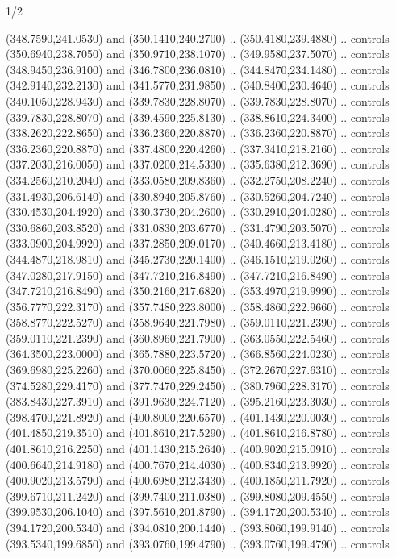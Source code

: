 \begin{flagdescription}{1/2}
\begin{scope}[xshift=0.5\flaglength]
\begin{scope}[scale=0.004\flagwidth,xshift=-90mm,yshift=89mm]
\begin{scope}[y=0.80pt, x=0.80pt, yscale=-1, xscale=1, inner sep=0pt, outer sep=0pt]
  (348.7590,241.0530) and (350.1410,240.2700) .. (350.4180,239.4880) .. controls
  (350.6940,238.7050) and (350.9710,238.1070) .. (349.9580,237.5070) .. controls
  (348.9450,236.9100) and (346.7800,236.0810) .. (344.8470,234.1480) .. controls
  (342.9140,232.2130) and (341.5770,231.9850) .. (340.8400,230.4640) .. controls
  (340.1050,228.9430) and (339.7830,228.8070) .. (339.7830,228.8070) .. controls
  (339.7830,228.8070) and (339.4590,225.8130) .. (338.8610,224.3400) .. controls
  (338.2620,222.8650) and (336.2360,220.8870) .. (336.2360,220.8870) .. controls
  (336.2360,220.8870) and (337.4800,220.4260) .. (337.3410,218.2160) .. controls
  (337.2030,216.0050) and (337.0200,214.5330) .. (335.6380,212.3690) .. controls
  (334.2560,210.2040) and (333.0580,209.8360) .. (332.2750,208.2240) .. controls
  (331.4930,206.6140) and (330.8940,205.8760) .. (330.5260,204.7240) .. controls
  (330.4530,204.4920) and (330.3730,204.2600) .. (330.2910,204.0280) .. controls
  (330.6860,203.8520) and (331.0830,203.6770) .. (331.4790,203.5070) .. controls
  (333.0900,204.9920) and (337.2850,209.0170) .. (340.4660,213.4180) .. controls
  (344.4870,218.9810) and (345.2730,220.1400) .. (346.1510,219.0260) .. controls
  (347.0280,217.9150) and (347.7210,216.8490) .. (347.7210,216.8490) .. controls
  (347.7210,216.8490) and (350.2160,217.6820) .. (353.4970,219.9990) .. controls
  (356.7770,222.3170) and (357.7480,223.8000) .. (358.4860,222.9660) .. controls
  (358.8770,222.5270) and (358.9640,221.7980) .. (359.0110,221.2390) .. controls
  (359.0110,221.2390) and (360.8960,221.7900) .. (363.0550,222.5460) .. controls
  (364.3500,223.0000) and (365.7880,223.5720) .. (366.8560,224.0230) .. controls
  (369.6980,225.2260) and (370.0060,225.8450) .. (372.2670,227.6310) .. controls
  (374.5280,229.4170) and (377.7470,229.2450) .. (380.7960,228.3170) .. controls
  (383.8430,227.3910) and (391.9630,224.7120) .. (395.2160,223.3030) .. controls
  (398.4700,221.8920) and (400.8000,220.6570) .. (401.1430,220.0030) .. controls
  (401.4850,219.3510) and (401.8610,217.5290) .. (401.8610,216.8780) .. controls
  (401.8610,216.2250) and (401.1430,215.2640) .. (400.9020,215.0910) .. controls
  (400.6640,214.9180) and (400.7670,214.4030) .. (400.8340,213.9920) .. controls
  (400.9020,213.5790) and (400.6980,212.3430) .. (400.1850,211.7920) .. controls
  (399.6710,211.2420) and (399.7400,211.0380) .. (399.8080,209.4550) .. controls
  (399.9530,206.1040) and (397.5610,201.8790) .. (394.1720,200.5340) .. controls
  (394.1720,200.5340) and (394.0810,200.1440) .. (393.8060,199.9140) .. controls
  (393.5340,199.6850) and (393.0760,199.4790) .. (393.0760,199.4790) .. controls

\end{scope}
\end{scope}
\end{scope}
\end{flagdescription}
